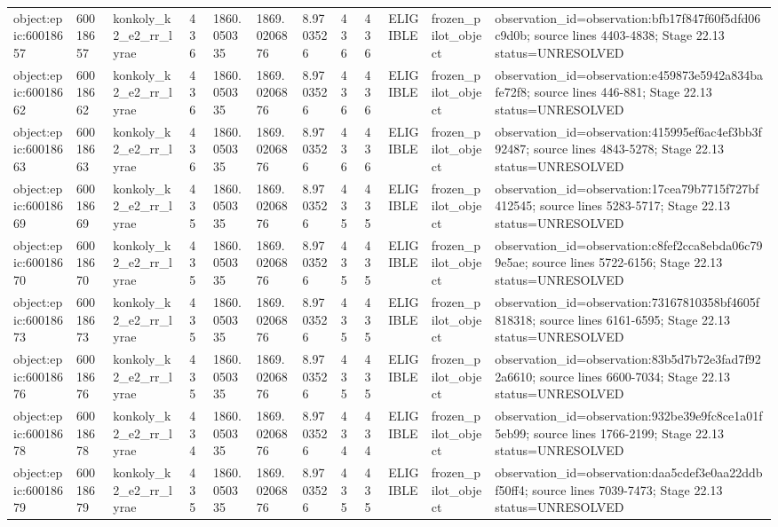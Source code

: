 \begin{longtable}{llllllllllll}
object:epic:60018657 & 60018657 & konkoly\_k2\_e2\_rr\_lyrae & 436 & 1860.050335 & 1869.0206876 & 8.9703526 & 436 & 436 & ELIGIBLE & frozen\_pilot\_object & observation\_id=observation:bfb17f847f60f5dfd06c9d0b; source lines 4403-4838; Stage 22.13 status=UNRESOLVED \\
object:epic:60018662 & 60018662 & konkoly\_k2\_e2\_rr\_lyrae & 436 & 1860.050335 & 1869.0206876 & 8.9703526 & 436 & 436 & ELIGIBLE & frozen\_pilot\_object & observation\_id=observation:e459873e5942a834bafe72f8; source lines 446-881; Stage 22.13 status=UNRESOLVED \\
object:epic:60018663 & 60018663 & konkoly\_k2\_e2\_rr\_lyrae & 436 & 1860.050335 & 1869.0206876 & 8.9703526 & 436 & 436 & ELIGIBLE & frozen\_pilot\_object & observation\_id=observation:415995ef6ac4ef3bb3f92487; source lines 4843-5278; Stage 22.13 status=UNRESOLVED \\
object:epic:60018669 & 60018669 & konkoly\_k2\_e2\_rr\_lyrae & 435 & 1860.050335 & 1869.0206876 & 8.9703526 & 435 & 435 & ELIGIBLE & frozen\_pilot\_object & observation\_id=observation:17cea79b7715f727bf412545; source lines 5283-5717; Stage 22.13 status=UNRESOLVED \\
object:epic:60018670 & 60018670 & konkoly\_k2\_e2\_rr\_lyrae & 435 & 1860.050335 & 1869.0206876 & 8.9703526 & 435 & 435 & ELIGIBLE & frozen\_pilot\_object & observation\_id=observation:c8fef2cca8ebda06c799e5ae; source lines 5722-6156; Stage 22.13 status=UNRESOLVED \\
object:epic:60018673 & 60018673 & konkoly\_k2\_e2\_rr\_lyrae & 435 & 1860.050335 & 1869.0206876 & 8.9703526 & 435 & 435 & ELIGIBLE & frozen\_pilot\_object & observation\_id=observation:73167810358bf4605f818318; source lines 6161-6595; Stage 22.13 status=UNRESOLVED \\
object:epic:60018676 & 60018676 & konkoly\_k2\_e2\_rr\_lyrae & 435 & 1860.050335 & 1869.0206876 & 8.9703526 & 435 & 435 & ELIGIBLE & frozen\_pilot\_object & observation\_id=observation:83b5d7b72e3fad7f922a6610; source lines 6600-7034; Stage 22.13 status=UNRESOLVED \\
object:epic:60018678 & 60018678 & konkoly\_k2\_e2\_rr\_lyrae & 434 & 1860.050335 & 1869.0206876 & 8.9703526 & 434 & 434 & ELIGIBLE & frozen\_pilot\_object & observation\_id=observation:932be39e9fc8ce1a01f5eb99; source lines 1766-2199; Stage 22.13 status=UNRESOLVED \\
object:epic:60018679 & 60018679 & konkoly\_k2\_e2\_rr\_lyrae & 435 & 1860.050335 & 1869.0206876 & 8.9703526 & 435 & 435 & ELIGIBLE & frozen\_pilot\_object & observation\_id=observation:daa5cdef3e0aa22ddbf50ff4; source lines 7039-7473; Stage 22.13 status=UNRESOLVED \\

\end{longtable}
